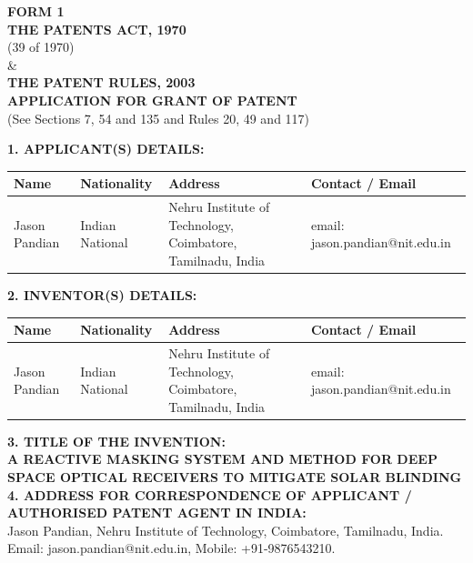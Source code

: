 \documentclass[12pt,a4paper]{article}
\begin{document}
\begin{center}
    \textbf{\large FORM 1} \\
    \vspace{0.2cm}
    \textbf{THE PATENTS ACT, 1970} \\
    (39 of 1970) \\
    \& \\
    \textbf{THE PATENT RULES, 2003} \\
    \vspace{0.4cm}
    \textbf{\large APPLICATION FOR GRANT OF PATENT} \\
    (See Sections 7, 54 and 135 and Rules 20, 49 and 117) \\
\end{center}

\vspace{0.5cm}

\noindent \textbf{1. APPLICANT(S) DETAILS:}
\begin{table}[h!]
\centering
\small
\begin{tabular}{|p{3cm}|p{2cm}|p{3.5cm}|p{6cm}|}
\hline
\textbf{Name} & \textbf{Nationality} & \textbf{Address} & \textbf{Contact / Email} \\ \hline
Jason Pandian & Indian National & Nehru Institute of Technology, Coimbatore, Tamilnadu, India & email: jason.pandian@nit.edu.in \\ \hline
\end{tabular}
\end{table}

\noindent \textbf{2. INVENTOR(S) DETAILS:}
\begin{table}[h!]
\centering
\small
\begin{tabular}{|p{3cm}|p{2cm}|p{3.5cm}|p{6cm}|}
\hline
\textbf{Name} & \textbf{Nationality} & \textbf{Address} & \textbf{Contact / Email} \\ \hline
Jason Pandian & Indian National & Nehru Institute of Technology, Coimbatore, Tamilnadu, India & email: jason.pandian@nit.edu.in \\ \hline
\end{tabular}
\end{table}

\noindent \textbf{3. TITLE OF THE INVENTION:} \\
\textbf{A REACTIVE MASKING SYSTEM AND METHOD FOR DEEP SPACE OPTICAL RECEIVERS TO MITIGATE SOLAR BLINDING} \\

\noindent \textbf{4. ADDRESS FOR CORRESPONDENCE OF APPLICANT / AUTHORISED PATENT AGENT IN INDIA:} \\
Jason Pandian, Nehru Institute of Technology, Coimbatore, Tamilnadu, India. Email: jason.pandian@nit.edu.in, Mobile: +91-9876543210. \\
\end{document}
